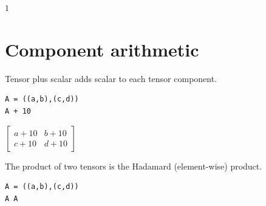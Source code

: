 \documentclass[12pt]{article}
\begin{document}
$1$

\newpage

\section{Component arithmetic}

Tensor plus scalar adds scalar to each tensor component.

{\color{blue}
\begin{verbatim}
A = ((a,b),(c,d))
A + 10
\end{verbatim}}

$\displaystyle
\begin{bmatrix}
a+10 & b+10
\\[1ex]
c+10 & d+10
\end{bmatrix}
$

\bigskip
The product of two tensors is the Hadamard (element-wise) product.

{\color{blue}
\begin{verbatim}
A = ((a,b),(c,d))
A A
\end{verbatim}}
\end{document}
